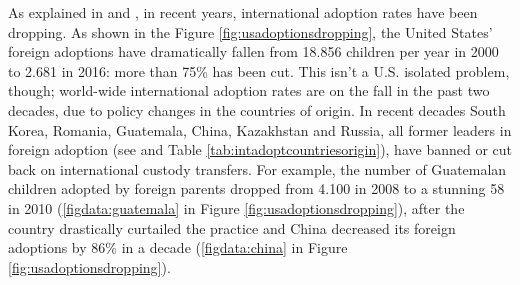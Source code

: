 As explained in \cite{adoptdropping_article} and \cite{adoptdropping_book}, in recent years, international adoption rates have been dropping. As shown in the Figure \ref{fig:usadoptionsdropping}, the United States' foreign adoptions have dramatically fallen from 18.856 children per year in 2000 to 2.681 in 2016: more than 75\% has been cut. This isn't a U.S. isolated problem, though; world-wide international adoption rates are on the fall in the past two decades, due to policy changes in the countries of origin. In recent decades South Korea, Romania, Guatemala, China, Kazakhstan and Russia, all former leaders in foreign adoption (see \cite{unreport} and Table \ref{tab:intadoptcountriesorigin}), have banned or cut back on international custody transfers. For example, the number of Guatemalan children adopted by foreign parents dropped from 4.100 in 2008 to a stunning 58 in 2010 (\ref{figdata:guatemala} in Figure \ref{fig:usadoptionsdropping}), after the country drastically curtailed the practice and China decreased its foreign adoptions by 86\% in a decade (\ref{figdata:china} in Figure \ref{fig:usadoptionsdropping}).

